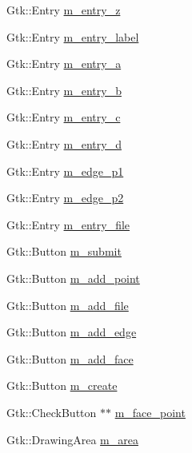 \begin{DoxyCompactItemize}
\item 
Gtk\+::\+Entry \hyperlink{class_projection_window_a7e164e49ce6775ff25abf0ffb62fbd44}{m\+\_\+entry\+\_\+z}
\item 
Gtk\+::\+Entry \hyperlink{class_projection_window_a490b52bafb75b5e5530bf1802b02e16a}{m\+\_\+entry\+\_\+label}
\item 
Gtk\+::\+Entry \hyperlink{class_projection_window_a54f16f711d126320ac548e3bbc7a042d}{m\+\_\+entry\+\_\+a}
\item 
Gtk\+::\+Entry \hyperlink{class_projection_window_aa5f43966a100ea7df6ee79cc980d90be}{m\+\_\+entry\+\_\+b}
\item 
Gtk\+::\+Entry \hyperlink{class_projection_window_a3b4562aa11344b7676182bf35502881f}{m\+\_\+entry\+\_\+c}
\item 
Gtk\+::\+Entry \hyperlink{class_projection_window_a5ae59154fe9dd24c67e3db07c0d75521}{m\+\_\+entry\+\_\+d}
\item 
Gtk\+::\+Entry \hyperlink{class_projection_window_ae18dd1142ec2291156359d603627f260}{m\+\_\+edge\+\_\+p1}
\item 
Gtk\+::\+Entry \hyperlink{class_projection_window_a2cc6daee71ec01c27f32e02c49ade20e}{m\+\_\+edge\+\_\+p2}
\item 
Gtk\+::\+Entry \hyperlink{class_projection_window_a8472c7e0a9adabbd0513ef1ef27cffd7}{m\+\_\+entry\+\_\+file}
\item 
Gtk\+::\+Button \hyperlink{class_projection_window_a1081eb0b152ae185a1f20b433c58b276}{m\+\_\+submit}
\item 
Gtk\+::\+Button \hyperlink{class_projection_window_a03c1bd15354e834e53e9c9fed3ed8d5c}{m\+\_\+add\+\_\+point}
\item 
Gtk\+::\+Button \hyperlink{class_projection_window_ae9fa524662253dcf60873ccbfb525e53}{m\+\_\+add\+\_\+file}
\item 
Gtk\+::\+Button \hyperlink{class_projection_window_a0baecbe177aeb406dee043a3fba5c6f2}{m\+\_\+add\+\_\+edge}
\item 
Gtk\+::\+Button \hyperlink{class_projection_window_a87da0ada2d0513183f6f6a2c3a71ad89}{m\+\_\+add\+\_\+face}
\item 
Gtk\+::\+Button \hyperlink{class_projection_window_ad2730bbdb94961b441cb6a40c937326e}{m\+\_\+create}
\item 
Gtk\+::\+Check\+Button $\ast$$\ast$ \hyperlink{class_projection_window_ae4ba55b88388ba52011c1c5d3ca215a7}{m\+\_\+face\+\_\+point}
\item 
Gtk\+::\+Drawing\+Area \hyperlink{class_projection_window_a339dcd397e1421ed780004f90a59ce34}{m\+\_\+area}
\end{DoxyCompactItemize}


